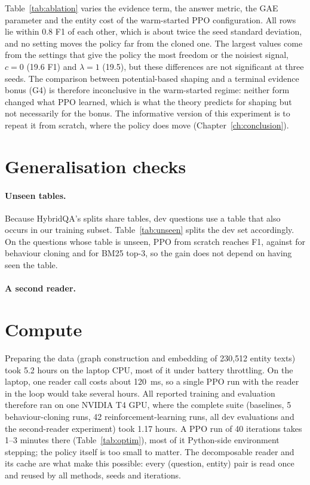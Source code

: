Table~\ref{tab:ablation} varies the evidence term, the answer metric, the GAE parameter and the entity cost of the warm-started PPO configuration. All rows lie within 0.8 F1 of each other, which is about twice the seed standard deviation, and no setting moves the policy far from the cloned one. The largest values come from the settings that give the policy the most freedom or the noisiest signal, $c=0$ (19.6 F1) and $\lambda=1$ (19.5), but these differences are not significant at three seeds. The comparison between potential-based shaping and a terminal evidence bonus (G4) is therefore inconclusive in the warm-started regime: neither form changed what PPO learned, which is what the theory predicts for shaping but not necessarily for the bonus. The informative version of this experiment is to repeat it from scratch, where the policy does move (Chapter~\ref{ch:conclusion}).



\section{Generalisation checks}
\label{sec:unseen}

\paragraph{Unseen tables.} Because HybridQA's splits share tables, \testQuestionsWithTrainTable{} dev questions use a table that also occurs in our training subset. Table~\ref{tab:unseen} splits the dev set accordingly. On the questions whose table is unseen, PPO from scratch reaches \fScratchUnseen{} F1, against \fBcUnseen{} for behaviour cloning and \fBmThreeUnseen{} for BM25 top-3, so the gain does not depend on having seen the table.



\paragraph{A second reader.} 

\section{Compute}
\label{sec:compute}

Preparing the data (graph construction and embedding of 230{,}512 entity texts) took 5.2 hours on the laptop CPU, most of it under battery throttling. On the laptop, one reader call costs about 120~ms, so a single PPO run with the reader in the loop would take several hours. All reported training and evaluation therefore ran on one NVIDIA T4 GPU, where the complete suite (baselines, 5 behaviour-cloning runs, 42 reinforcement-learning runs, all dev evaluations and the second-reader experiment) took 1.17 hours. A PPO run of 40 iterations takes 1--3 minutes there (Table~\ref{tab:optim}), most of it Python-side environment stepping; the policy itself is too small to matter. The decomposable reader and its cache are what make this possible: every (question, entity) pair is read once and reused by all methods, seeds and iterations.
